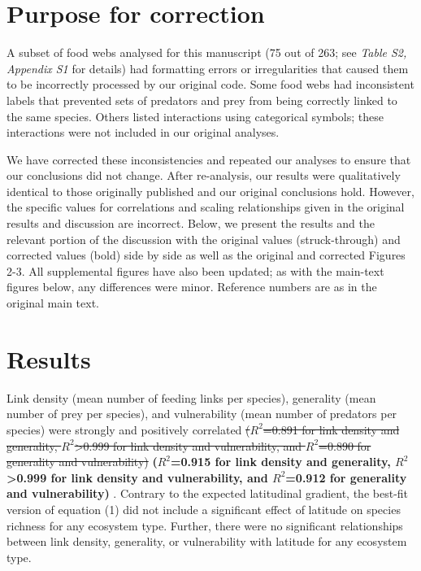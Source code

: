 \documentclass[12pt]{article}
\begin{document}
\begin{spacing}{2.0}

\section*{Purpose for correction}

    A subset of food webs analysed for this manuscript (75 out of 263; see \emph{Table S2, Appendix S1} for details) had formatting errors or irregularities that caused them to be incorrectly processed by our original code. Some food webs had inconsistent labels that prevented sets of predators and prey from being correctly linked to the same species. Others listed interactions using categorical symbols; these interactions were not included in our original analyses.


    We have corrected these inconsistencies and repeated our analyses to ensure that our conclusions did not change. After re-analysis, our results were qualitatively identical to those originally published and our original conclusions hold. However, the specific values for correlations and scaling relationships given in the original results and discussion are incorrect. Below, we present the results and the relevant portion of the discussion with the original values (struck-through) and corrected values (bold) side by side as well as the original and corrected Figures 2-3.  All supplemental figures have also been updated; as with the main-text figures below, any differences were minor. Reference numbers are as in the original main text.


\section*{Results}

    Link density (mean number of feeding links per species), generality (mean
    number of prey per species), and vulnerability (mean number of predators per
    species) were strongly and positively correlated \st{($R^2$=0.891 for link
    density and generality, $R^2$\textgreater0.999 for link density and
    vulnerability, and $R^2$=0.890 for generality and vulnerability)}
    \textbf{($R^2$=0.915 for link
    density and generality, $R^2$\textgreater0.999 for link density and
    vulnerability, and $R^2$=0.912 for generality and vulnerability)}
    . Contrary
    to the expected latitudinal gradient, the best-fit version of
    equation (1) did not include a significant
    effect of latitude on species richness for any ecosystem type. Further, there were no significant
    relationships between link density, generality, or vulnerability with
    latitude for any ecosystem type.



\end{spacing}
\end{document}
